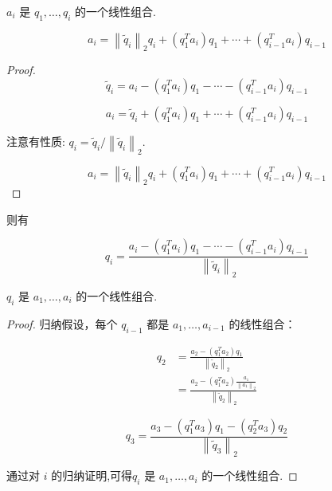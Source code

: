 \begin{corollary}
    $ a_{i} $ 是 $ q_{1}, \ldots, q_{i} $ 的一个线性组合.
    
    $$ a_{i}=\left\|\tilde{q}_{i}\right\|_{2} q_{i}+\left(q_{1}^{T} a_{i}\right) q_{1}+\cdots+\left(q_{i-1}^{T} a_{i}\right) q_{i-1} $$
\end{corollary}

\begin{proof}
    $$ \widetilde{q}_{i}=a_{i}-\left(q_{1}^{T} a_{i}\right) q_{1}-\cdots-\left(q_{i-1}^{T} a_{i}\right) q_{i-1} $$

    $$a_{i}= \widetilde{q}_{i}+\left(q_{1}^{T} a_{i}\right) q_{1}+\cdots+\left(q_{i-1}^{T} a_{i}\right) q_{i-1} $$

    注意有性质: $ q_{i}=\widetilde{q}_{i} /\left\|\widetilde{q}_{i}\right\|_{2} $.

    $$ a_{i}=\left\|\tilde{q}_{i}\right\|_{2} q_{i}+\left(q_{1}^{T} a_{i}\right) q_{1}+\cdots+\left(q_{i-1}^{T} a_{i}\right) q_{i-1} $$
\end{proof}


则有 

\begin{corollary}
    $$q_{i} = \frac{a_{i}-\left(q_{1}^{T} a_{i}\right) q_{1}-\cdots-\left(q_{i-1}^{T} a_{i}\right) q_{i-1}}{\left\|\tilde{q}_{i}\right\|_{2}}$$
\end{corollary}


\begin{corollary}
    $ q_{i} $ 是 $ a_{1}, \ldots, a_{i} $ 的一个线性组合.
\end{corollary}

\begin{proof}
    归纳假设，每个 $ q_{i-1} $ 都是 $ a_{1}, \ldots, a_{i-1} $ 的线性组合：

    $$ \begin{aligned}q_{2}&= \frac{a_{2}-\left(q_{1}^{T} a_{2}\right) q_{1}}{\left\|\tilde{q}_{2}\right\|_{2}}
        \\ &=
        \frac{a_{2}-\left(q_{1}^{T} a_{2}\right) \frac{ a_{1} }{\left\|a_{1}\right\|_{2}} }{\left\|\tilde{q}_{2}\right\|_{2}}
    \end{aligned} $$

$$ q_{3}=
\frac{a_{3}-\left(q_{1}^{T} a_{3}\right) q_{1}-\left(q_{2}^{T} a_{3}\right) q_{2}}{\left\|\tilde{q}_{3}\right\|_2 }  $$

通过对 $ i $ 的归纳证明,可得$ q_{i} $ 是 $ a_{1}, \ldots, a_{i} $ 的一个线性组合.
\end{proof}


